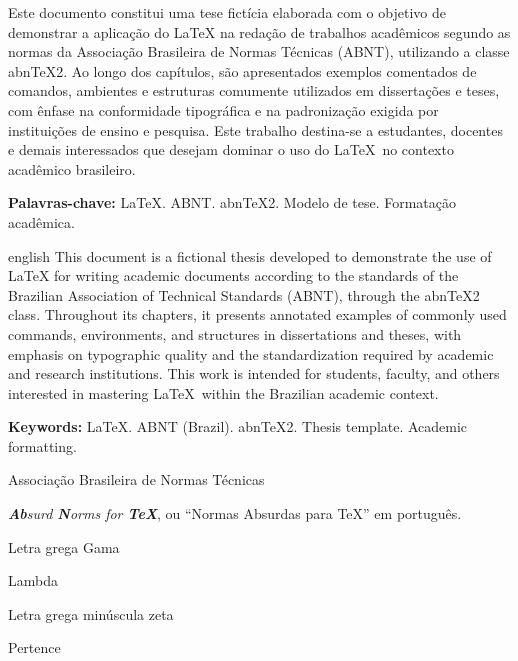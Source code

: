 \setlength{\absparsep}{18pt} %

\begin{resumo}
    Este documento constitui uma tese fictícia elaborada com o objetivo de demonstrar a aplicação do \LaTeX{} na redação de trabalhos acadêmicos segundo as normas da Associação Brasileira de Normas Técnicas (ABNT), utilizando a classe abn\TeX 2. Ao longo dos capítulos, são apresentados exemplos comentados de comandos, ambientes e estruturas comumente utilizados em dissertações e teses, com ênfase na conformidade tipográfica e na padronização exigida por instituições de ensino e pesquisa. Este trabalho destina-se a estudantes, docentes e demais interessados que desejam dominar o uso do \LaTeX\ no contexto acadêmico brasileiro.

    \textbf{Palavras-chave:} \LaTeX. ABNT. abn\TeX 2. Modelo de tese. Formatação acadêmica.
\end{resumo}


\begin{resumo}[Abstract]
    \begin{otherlanguage*}{english}
        This document is a fictional thesis developed to demonstrate the use of \LaTeX{} for writing academic documents according to the standards of the Brazilian Association of Technical Standards (ABNT), through the abn\TeX 2 class. Throughout its chapters, it presents annotated examples of commonly used commands, environments, and structures in dissertations and theses, with emphasis on typographic quality and the standardization required by academic and research institutions. This work is intended for students, faculty, and others interested in mastering \LaTeX\ within the Brazilian academic context.

        \textbf{Keywords:} \LaTeX. ABNT (Brazil). abn\TeX 2. Thesis template. Academic formatting.
    \end{otherlanguage*}
\end{resumo}


\listoffigures*
\cleardoublepage

\listoftables*
\cleardoublepage


\begin{siglas}
    \item[ABNT] Associação Brasileira de Normas Técnicas
    \item[abn\TeX] \emph{\textbf{Ab}surd \textbf{N}orms for \textbf{\TeX}}, ou ``Normas Absurdas para \TeX'' em português.
\end{siglas}


\begin{simbolos}
    \item[$ \Gamma $] Letra grega Gama
    \item[$ \Lambda $] Lambda
    \item[$ \zeta $] Letra grega minúscula zeta
    \item[$ \in $] Pertence
\end{simbolos}


\tableofcontents*
\cleardoublepage


\textual
